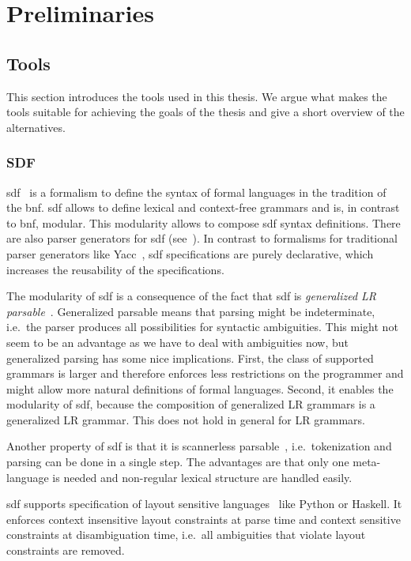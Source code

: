 \chapter{Preliminaries}
\section{Tools}
This section introduces the tools used in this thesis. We argue what
makes the tools suitable for achieving the goals of the thesis and
give a short overview of the alternatives.

\subsection{SDF}
\gls{sdf}~\cite{Heering:1989:SDF:71605.71607} is a formalism to define
the syntax of formal languages in the tradition of the
\gls{bnf}. \gls{sdf} allows to define lexical and context-free
grammars and is, in contrast to \gls{bnf}, modular. This modularity
allows to compose \gls{sdf} syntax definitions. There are also parser
generators for \gls{sdf} (see~\cite{Rekers92parsergeneration}). In
contrast to formalisms for traditional parser generators like
Yacc~\cite{Johnson75yacc:yet}, \gls{sdf} specifications are purely
declarative, which increases the reusability of the specifications.

The modularity of \gls{sdf} is a consequence of the fact that
\gls{sdf} is \textit{generalized LR
  parsable}~\cite{Rekers92parsergeneration}. Generalized parsable
means that parsing might be indeterminate, i.e.\ the parser produces
all possibilities for syntactic ambiguities. This might not seem to be
an advantage as we have to deal with ambiguities now, but generalized
parsing has some nice implications. First, the class of supported
grammars is larger and therefore enforces less restrictions on the
programmer and might allow more natural definitions of formal
languages. Second, it enables the modularity of \gls{sdf}, because the
composition of generalized LR grammars is a generalized LR
grammar. This does not hold in general for LR grammars.

Another property of \gls{sdf} is that it is scannerless
parsable~\cite{Brand02disambiguationfilters}, i.e.\ tokenization and
parsing can be done in a single step. The advantages are that only one
meta-language is needed and non-regular lexical structure are handled
easily.

\gls{sdf} supports specification of layout sensitive
languages~\cite{conf/sle/ErdwegRKO12} like Python or Haskell. It
enforces context insensitive layout constraints at parse time and
context sensitive constraints at disambiguation time, i.e.\ all
ambiguities that violate layout constraints are removed.

